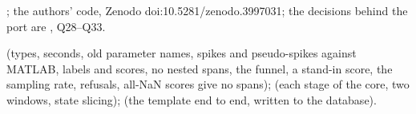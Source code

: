 \citet{dehshibi2021electrical}; the authors' code, Zenodo doi:10.5281/zenodo.3997031; the
decisions behind the port are , Q28--Q33.

 (types, seconds, old parameter names, spikes
and pseudo-spikes against MATLAB, labels and scores, no nested spans, the funnel, a stand-in
score, the sampling rate, refusals, all-NaN scores give no spans);
 (each stage of the core, two windows, state slicing);
 (the template end to end, written to the database).
